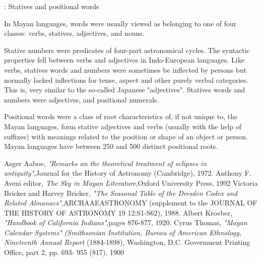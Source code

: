 \documentclass[12pt]{article}
\begin{document}
: Statives and positional words

In Mayan languages, words were usually viewed as belonging to one of four classes: verbs, statives, adjectives, and nouns.

Stative numbers were  predicates of four-part astronomical cycles. The syntactic properties fell  between verbs and adjectives in Indo-European languages. Like verbs, statives words and numbers were sometimes be inflected by persons but normally lacked inflections for tense, aspect and other purely verbal categories. This is, very similar to the so-called Japanese "adjectives". Statives words and numbers were adjectives, and  positional numerals.

Positional words were a class of root characteristics of, if not unique to, the Mayan languages, form stative adjectives and verbs (usually with the help of suffixes) with meanings related to the position or shape of an object or person. Mayan languages have between 250 and 500 distinct positional roots.

\begin{thebibliography}{5}

 Asger Aaboe, \emph{"Remarks on the theoretical treatment of eclipses in antiquity"},Journal for the History of Astronomy (Cambridge), 1972.
 Anthony F. Aveni editor, \emph{The Sky in Mayan Literature},Oxford University Press, 1992 
 Victoria Bricker and Harvey Bricker, \emph{"The Seasonal Table of the Dresden Codex and Related Almanacs"},ARCHAAEASTRONOMY (supplement to the JOURNAL OF THE HISTORY OF ASTRONOMY 19 12:S1-S62), 1988.
 Albert Kroeber, \emph{"Handbook of California Indians"},pages 876-877, 1920.
 Cyrus Thomas, \emph{"Mayan Calendar Systems"  (Smithsonian Institution, Bureau of  American Ethnology, Nineteenth Annual Report} (1884-1898), Washington, D.C. Government Printing Office, part 2, pp. 693- 955 (817), 1900

\end{thebibliography}

\end{document}
